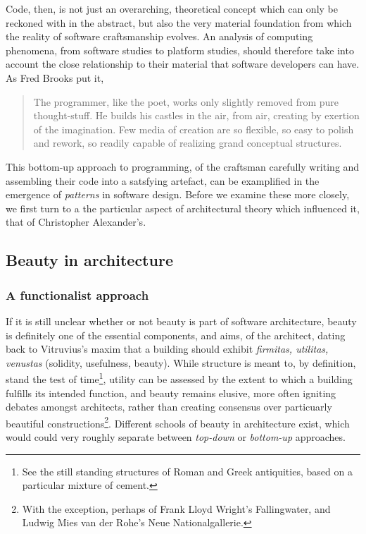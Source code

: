 \documentclass{article}
\begin{document}
Code, then, is not just an overarching, theoretical concept which can only be reckoned with in the abstract, but also the very material foundation from which the reality of software craftsmanship evolves. An analysis of computing phenomena, from software studies to platform studies, should therefore take into account the close relationship to their material that software developers can have. As Fred Brooks put it,

\begin{quote}
    The programmer, like the poet, works only slightly removed from pure thought-stuff. He builds his castles in the air, from air, creating by exertion of the imagination. Few media of creation are so flexible, so easy to polish and rework, so readily capable of realizing grand conceptual structures.\cite{brooks_mythical_1975}
\end{quote}

This bottom-up approach to programming, of the craftsman carefully writing and assembling their code into a satsfying artefact, can be examplified in the emergence of \emph{patterns} in software design. Before we examine these more closely, we first turn to a the particular aspect of architectural theory which influenced it, that of Christopher Alexander's.

\vspace{1\baselineskip}

\subsection{Beauty in architecture}

\subsubsection{A functionalist approach}

If it is still unclear whether or not beauty is part of software architecture, beauty is definitely one of the essential components, and aims, of the architect, dating back to Vitruvius's maxim that a building should exhibit \emph{firmitas, utilitas, venustas} (solidity, usefulness, beauty). While structure is meant to, by definition, stand the test of time\footnote{See the still standing structures of Roman and Greek antiquities, based on a particular mixture of cement.}, utility can be assessed by the extent to which a building fulfills its intended function, and beauty remains elusive, more often igniting debates amongst architects, rather than creating consensus over particuarly beautiful constructions\footnote{With the exception, perhaps of Frank Lloyd Wright's Fallingwater, and Ludwig Mies van der Rohe's Neue Nationalgallerie.}. Different schools of beauty in architecture exist, which would could very roughly separate between \emph{top-down} or \emph{bottom-up} approaches.
\end{document}
